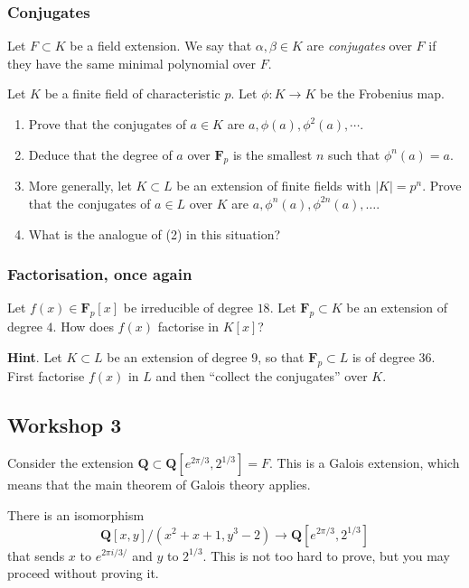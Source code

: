 \documentclass[11pt]{article}
\begin{document}
\subsubsection{Conjugates}
\label{sec:org00211e4}

Let \(F \subset K\) be a field extension.
We say that \(\alpha, \beta \in K\) are \emph{conjugates} over \(F\) if they have the same minimal polynomial over \(F\).

Let \(K\) be a finite field of characteristic \(p\).
Let \(\phi \colon K \to K\) be the Frobenius map.
\begin{enumerate}
\item Prove that the conjugates of \(a \in K\) are \(a, \phi(a), \phi^2(a), \cdots\).
\item Deduce that the degree of \(a\) over \(\mathbf{F}_p\) is the smallest \(n\) such that \(\phi^n(a) = a\).
\item More generally, let \(K \subset L\) be an extension of finite fields with \(|K| = p^n\).
Prove that the conjugates of \(a \in L\) over \(K\) are \(a, \phi^n(a), \phi^{2n}(a), \dots\).
\item What is the analogue of (2) in this situation?
\end{enumerate}
\subsubsection{Factorisation, once again}
\label{sec:orgb749011}

Let \(f(x) \in \mathbf{F}_p[x]\) be irreducible of degree \(18\).
Let \(\mathbf{F}_p \subset K\) be an extension of degree \(4\).
How does \(f(x)\) factorise in \(K[x]\)?

\noindent
\textbf{Hint}.  Let \(K \subset L\) be an extension of degree 9, so that \(\mathbf{F}_p \subset L\) is of degree 36.  First factorise \(f(x)\) in \(L\) and then ``collect the conjugates'' over \(K\).
\subsection{Workshop 3}
\label{sec:org9d3aac3}
Consider the extension \(\mathbf{Q} \subset \mathbf{Q}[e^{2\pi/3}, 2^{1/3}] = F\).
This is a Galois extension, which means that the main theorem of Galois theory applies.

There is an isomorphism
\[ \mathbf{Q}[x,y]/(x^2+x+1, y^3-2) \to \mathbf{Q}[e^{2\pi/3}, 2^{1/3}]\]
that sends \(x\) to \(e^{2\pi i /3/}\) and \(y\) to \(2^{1/3}\).
This is not too hard to prove, but you may proceed without proving it.
\end{document}
